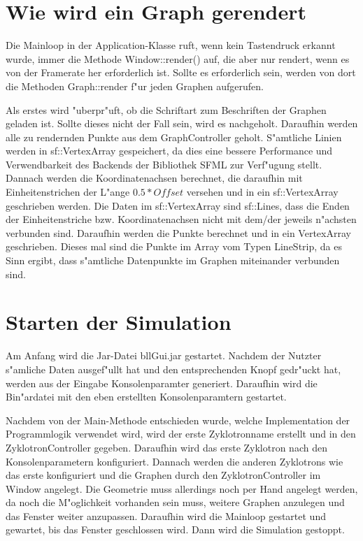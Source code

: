 \documentclass[14pt, a4paper]{report}
\begin{document}
\section{Wie wird ein Graph gerendert}
Die Mainloop in der Application-Klasse ruft, wenn kein Tastendruck erkannt wurde, immer
die Methode Window::render() auf, die aber nur rendert, wenn es von der Framerate her
erforderlich ist. Sollte es erforderlich sein, werden von dort die Methoden Graph::render
f"ur jeden Graphen aufgerufen.

Als erstes wird "uberpr"uft, ob die Schriftart zum Beschriften der Graphen geladen ist.
Sollte dieses nicht der Fall sein, wird es nachgeholt. Daraufhin werden alle zu 
rendernden Punkte aus dem GraphController geholt. S"amtliche Linien werden in 
sf::VertexArray gespeichert, da dies eine bessere Performance und Verwendbarkeit des
Backends der Bibliothek SFML zur Verf"ugung stellt. Dannach werden die Koordinatenachsen 
berechnet, die daraufhin mit Einheitenstrichen der L"ange $0.5 * Offset$ versehen und
in ein sf::VertexArray geschrieben werden. 
Die Daten im sf::VertexArray sind sf::Lines, dass die Enden der Einheitenstriche 
bzw. Koordinatenachsen nicht mit dem/der jeweils
n"achsten verbunden sind. Daraufhin werden die Punkte berechnet und in ein VertexArray
geschrieben. Dieses mal sind die Punkte im Array vom Typen LineStrip, da es Sinn ergibt,
dass s"amtliche Datenpunkte im Graphen miteinander verbunden sind.

\section{Starten der Simulation}
Am Anfang wird die Jar-Datei bllGui.jar gestartet. Nachdem der Nutzter s"amliche Daten
ausgef"ullt hat und den entsprechenden Knopf gedr"uckt hat, werden aus der Eingabe 
Konsolenparamter generiert. Daraufhin wird die Bin"ardatei mit den eben erstellten
Konsolenparamtern gestartet.

Nachdem von der Main-Methode entschieden wurde, welche Implementation der Programmlogik verwendet wird,
wird der erste Zyklotronname erstellt und in den ZyklotronController gegeben. Daraufhin
wird das erste Zyklotron nach den Konsolenparametern konfiguriert. Dannach werden die
anderen Zyklotrons wie das erste konfiguriert und die Graphen durch den
ZyklotronController im Window angelegt. Die Geometrie muss allerdings noch per Hand 
angelegt werden, da noch die M"oglichkeit vorhanden sein muss, weitere Graphen anzulegen
und das Fenster weiter anzupassen. Daraufhin wird die Mainloop gestartet und gewartet,
bis das Fenster geschlossen wird. Dann wird die Simulation gestoppt.
\end{document}
